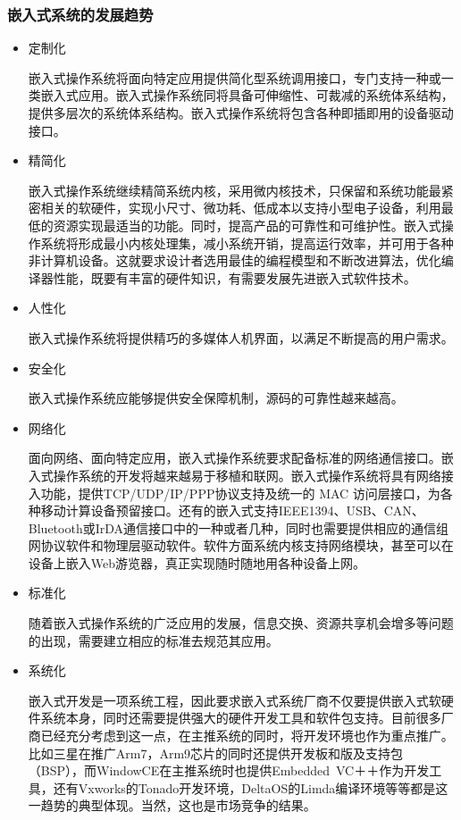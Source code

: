 \documentclass[12pt, a4paper]{article}
\begin{document}
	\subsubsection{嵌入式系统的发展趋势}
	\begin{itemize}
		
		\item 定制化
		
		嵌入式操作系统将面向特定应用提供简化型系统调用接口，专门支持一种或一类嵌入式应用。嵌入式操作系统同将具备可伸缩性、可裁减的系统体系结构，提供多层次的系统体系结构。嵌入式操作系统将包含各种即插即用的设备驱动接口。
		
		\item 精简化
		
		嵌入式操作系统继续精简系统内核，采用微内核技术，只保留和系统功能最紧密相关的软硬件，实现小尺寸、微功耗、低成本以支持小型电子设备，利用最低的资源实现最适当的功能。同时，提高产品的可靠性和可维护性。嵌入式操作系统将形成最小内核处理集，减小系统开销，提高运行效率，并可用于各种非计算机设备。这就要求设计者选用最佳的编程模型和不断改进算法，优化编译器性能，既要有丰富的硬件知识，有需要发展先进嵌入式软件技术。
		
		\item 人性化
		
		嵌入式操作系统将提供精巧的多媒体人机界面，以满足不断提高的用户需求。
		
		\item 安全化
		
		嵌入式操作系统应能够提供安全保障机制，源码的可靠性越来越高。
		
		\item 网络化
		
		面向网络、面向特定应用，嵌入式操作系统要求配备标准的网络通信接口。嵌入式操作系统的开发将越来越易于移植和联网。嵌入式操作系统将具有网络接入功能，提供TCP/UDP/IP/PPP协议支持及统一的 MAC 访问层接口，为各种移动计算设备预留接口。还有的嵌入式支持IEEE1394、USB、CAN、Bluetooth或IrDA通信接口中的一种或者几种，同时也需要提供相应的通信组网协议软件和物理层驱动软件。软件方面系统内核支持网络模块，甚至可以在设备上嵌入Web游览器，真正实现随时随地用各种设备上网。
		
		\item 标准化
		
		随着嵌入式操作系统的广泛应用的发展，信息交换、资源共享机会增多等问题的出现，需要建立相应的标准去规范其应用。
		
		\item 系统化
		
		嵌入式开发是一项系统工程，因此要求嵌入式系统厂商不仅要提供嵌入式软硬件系统本身，同时还需要提供强大的硬件开发工具和软件包支持。目前很多厂商已经充分考虑到这一点，在主推系统的同时，将开发环境也作为重点推广。比如三星在推广Arm7，Arm9芯片的同时还提供开发板和版及支持包（BSP），而WindowCE在主推系统时也提供Embedded VC＋＋作为开发工具，还有Vxworks的Tonado开发环境，DeltaOS的Limda编译环境等等都是这一趋势的典型体现。当然，这也是市场竞争的结果。
		

\end{itemize}
\end{document}
